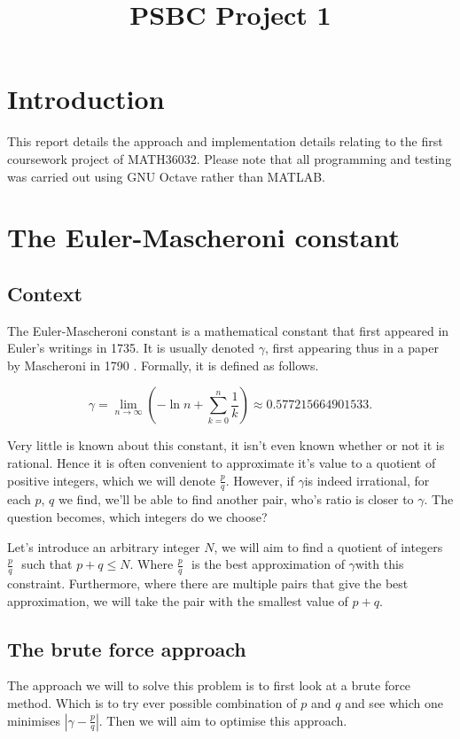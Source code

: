 \documentclass[10pt]{article}
\title{PSBC Project 1}
\newcommand*{\gam}{$\gamma$}
\newcommand*{\pdivq}{$\frac{p}{q} \text{ }$}
\newcommand{\inlinemaketitle}{{\let\newpage\relax\maketitle}}
\begin{document}
\inlinemaketitle
\section{Introduction}

This report details the approach and implementation details relating to the first coursework project of MATH36032. Please note that all programming and testing was carried out using GNU Octave rather than MATLAB.
\section{The Euler-Mascheroni constant}

\subsection{Context}
The Euler-Mascheroni constant is a mathematical constant that first appeared in Euler's writings in 1735. It is usually denoted \gam, first appearing thus in a paper by Mascheroni in 1790 \cite{eulerconst}. Formally, it is defined as follows.

\begin{equation}
\gamma = \lim_{n \to \infty}  \left( -\ln{n} + \sum_{k=0}^{n} \frac{1}{k}  \right) \approx 0.577215664901533.
\end{equation}

Very little is known about this constant, it isn't even known whether or not it is rational. Hence it is often convenient to approximate it's value to a quotient of positive integers, which we will denote $ \frac{p}{q}$. However, if \gam is indeed irrational, for each $p$, $q$ we find, we'll be able to find another pair, who's ratio is closer to \gam. The question becomes, which integers do we choose?

Let's introduce an arbitrary integer $N$, we will aim to find a quotient of integers \pdivq such that $p + q \leq N$. Where \pdivq is the best approximation of \gam with this constraint. Furthermore, where there are multiple pairs that give the best approximation, we will take the pair with the smallest value of $p+q$.

\subsection{The brute force approach}

The approach we will to solve this problem is to first look at a brute force method. Which is to try ever possible combination of $p$ and $q$ and see which one minimises $ | \gamma - \frac{p}{q} |$. Then we will aim to optimise this approach.
\end{document}

